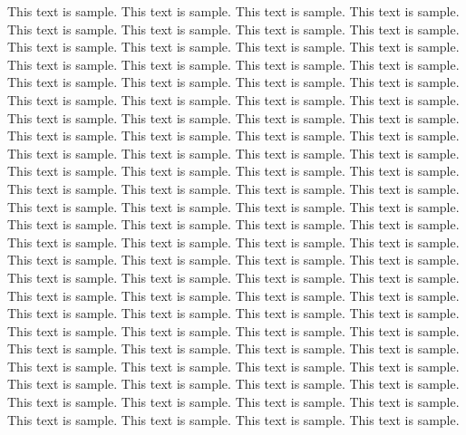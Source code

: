 This text is sample. This text is sample. This text is sample. This text is sample. This text is sample. This text is sample. This text is sample. This text is sample. This text is sample. This text is sample. This text is sample. This text is sample. This text is sample. This text is sample. This text is sample. This text is sample. This text is sample. This text is sample. This text is sample. This text is sample. This text is sample. This text is sample. This text is sample. This text is sample. This text is sample. This text is sample. This text is sample. This text is sample. This text is sample. This text is sample. This text is sample. This text is sample. This text is sample. This text is sample. This text is sample. This text is sample. This text is sample. This text is sample. This text is sample. This text is sample. This text is sample. This text is sample. This text is sample. This text is sample. This text is sample. This text is sample. This text is sample. This text is sample. This text is sample. This text is sample. This text is sample. This text is sample. This text is sample. This text is sample. This text is sample. This text is sample. This text is sample. This text is sample. This text is sample. This text is sample. This text is sample. This text is sample. This text is sample. This text is sample. This text is sample. This text is sample. This text is sample. This text is sample. This text is sample. This text is sample. This text is sample. This text is sample. This text is sample. This text is sample. This text is sample. This text is sample. This text is sample. This text is sample. This text is sample. This text is sample. This text is sample. This text is sample. This text is sample. This text is sample. This text is sample. This text is sample. This text is sample. This text is sample. This text is sample. This text is sample. This text is sample. This text is sample. This text is sample. This text is sample. This text is sample. This text is sample. 
